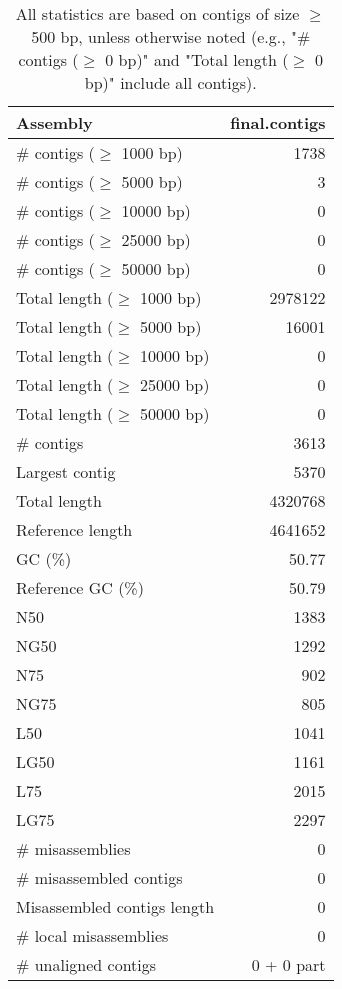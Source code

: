 \documentclass[12pt,a4paper]{article}
\begin{document}
\begin{table}[ht]
\begin{center}
\caption{All statistics are based on contigs of size $\geq$ 500 bp, unless otherwise noted (e.g., "\# contigs ($\geq$ 0 bp)" and "Total length ($\geq$ 0 bp)" include all contigs).}
\begin{tabular}{|l*{1}{|r}|}
\hline
Assembly & final.contigs \\ \hline
\# contigs ($\geq$ 1000 bp) & 1738 \\ \hline
\# contigs ($\geq$ 5000 bp) & 3 \\ \hline
\# contigs ($\geq$ 10000 bp) & 0 \\ \hline
\# contigs ($\geq$ 25000 bp) & 0 \\ \hline
\# contigs ($\geq$ 50000 bp) & 0 \\ \hline
Total length ($\geq$ 1000 bp) & 2978122 \\ \hline
Total length ($\geq$ 5000 bp) & 16001 \\ \hline
Total length ($\geq$ 10000 bp) & 0 \\ \hline
Total length ($\geq$ 25000 bp) & 0 \\ \hline
Total length ($\geq$ 50000 bp) & 0 \\ \hline
\# contigs & 3613 \\ \hline
Largest contig & 5370 \\ \hline
Total length & 4320768 \\ \hline
Reference length & 4641652 \\ \hline
GC (\%) & 50.77 \\ \hline
Reference GC (\%) & 50.79 \\ \hline
N50 & 1383 \\ \hline
NG50 & 1292 \\ \hline
N75 & 902 \\ \hline
NG75 & 805 \\ \hline
L50 & 1041 \\ \hline
LG50 & 1161 \\ \hline
L75 & 2015 \\ \hline
LG75 & 2297 \\ \hline
\# misassemblies & 0 \\ \hline
\# misassembled contigs & 0 \\ \hline
Misassembled contigs length & 0 \\ \hline
\# local misassemblies & 0 \\ \hline
\# unaligned contigs & 0 + 0 part \\ \hline

\end{tabular}
\end{center}
\end{table}
\end{document}
